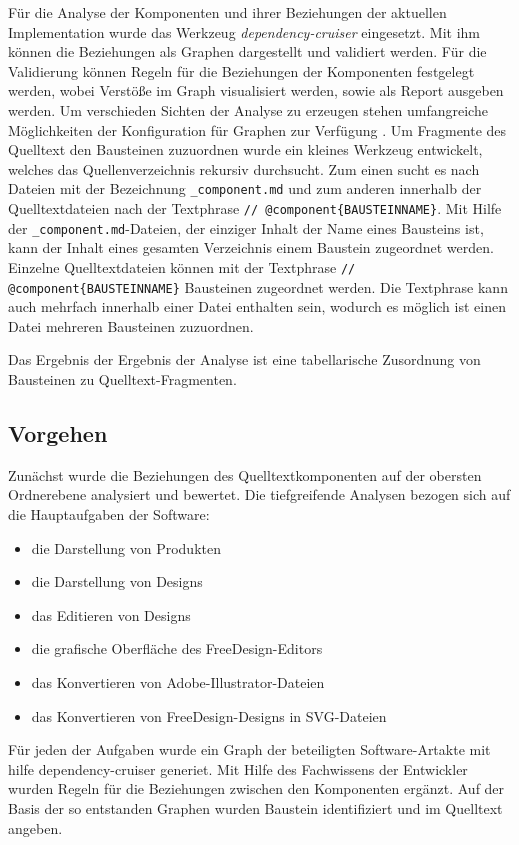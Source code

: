Für die Analyse der Komponenten und ihrer Beziehungen der aktuellen Implementation wurde das Werkzeug \emph{dependency-cruiser} eingesetzt. Mit ihm können die Beziehungen als Graphen dargestellt und validiert werden. Für die Validierung können Regeln für die Beziehungen der Komponenten festgelegt werden, wobei Verstöße im Graph visualisiert werden, sowie als Report ausgeben werden. Um verschieden Sichten der Analyse zu erzeugen stehen umfangreiche Möglichkeiten der Konfiguration für Graphen zur Verfügung \autocite[vgl.][]{Verweij:Dependency}.
Um Fragmente des Quelltext den Bausteinen zuzuordnen wurde ein kleines Werkzeug entwickelt, welches das Quellenverzeichnis rekursiv durchsucht. Zum einen sucht es nach Dateien mit der Bezeichnung \glqq\lstinline|_component.md|\grqq{} und zum anderen innerhalb der Quelltextdateien nach der Textphrase \glqq\lstinline|// @component{BAUSTEINNAME}|\grqq{}. 
Mit Hilfe der \lstinline|_component.md|-Dateien, der einziger Inhalt der Name eines Bausteins ist, kann der Inhalt eines gesamten Verzeichnis einem Baustein zugeordnet werden. Einzelne Quelltextdateien können mit der Textphrase \glqq\lstinline|// @component{BAUSTEINNAME}|\grqq{} Bausteinen zugeordnet werden. Die Textphrase kann auch mehrfach innerhalb einer Datei enthalten sein, wodurch es möglich ist einen Datei mehreren Bausteinen zuzuordnen. 

Das Ergebnis der Ergebnis der Analyse ist eine tabellarische Zusordnung von Bausteinen zu Quelltext-Fragmenten.

\subsection{Vorgehen}
Zunächst wurde die Beziehungen des Quelltextkomponenten auf der obersten Ordnerebene analysiert und bewertet.
Die tiefgreifende Analysen bezogen sich auf die Hauptaufgaben der Software:
\begin{itemize}
    \item die Darstellung von Produkten
    \item die Darstellung von Designs
    \item das Editieren von Designs
    \item die grafische Oberfläche des FreeDesign-Editors
    \item das Konvertieren von Adobe-Illustrator-Dateien
    \item das Konvertieren von FreeDesign-Designs in SVG-Dateien
\end{itemize}
Für jeden der Aufgaben wurde ein Graph der beteiligten Software-Artakte mit hilfe {dependency-cruiser} generiet. 
Mit Hilfe des Fachwissens der Entwickler wurden Regeln für die Beziehungen zwischen den Komponenten ergänzt. 
Auf der Basis der so entstanden Graphen wurden Baustein identifiziert und im Quelltext angeben.

